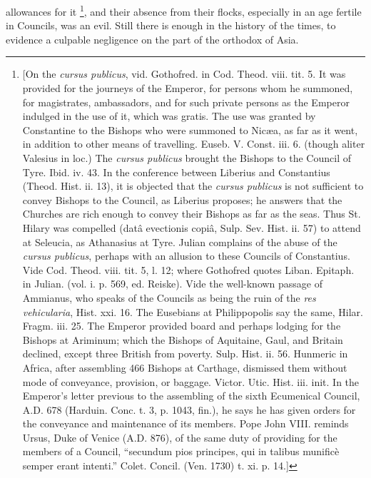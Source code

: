 allowances for it \footnote{[On the \emph{cursus publicus}, vid.
Gothofred. in Cod. Theod. viii. tit. 5. It was provided for the
journeys of the Emperor, for persons whom he summoned, for
magistrates, ambassadors, and for such private persons as the Emperor
indulged in the use of it, which was gratis. The use was granted by
Constantine to the Bishops who were summoned to Nicæa, as far as it
went, in addition to other means of travelling. Euseb. V. Const. iii.
6. (though aliter Valesius in loc.) The \emph{cursus publicus} brought
the Bishops to the Council of Tyre. Ibid. iv. 43. In the conference
between Liberius and Constantius (Theod. Hist. ii. 13), it is objected
that the \emph{cursus publicus} is not sufficient to convey Bishops to
the Council, as Liberius proposes; he answers that the Churches are
rich enough to convey their Bishops as far as the seas. Thus St.
Hilary was compelled (datâ evectionis copiâ, Sulp. Sev. Hist. ii.
57) to attend at Seleucia, as Athanasius at Tyre. Julian complains of
the abuse of the \emph{cursus publicus}, perhaps with an allusion to
these Councils of Constantius. Vide Cod. Theod. viii. tit. 5, l. 12;
where Gothofred quotes Liban. Epitaph. in Julian. (vol. i. p. 569, ed.
Reiske). Vide the well-known passage of Ammianus, who speaks of the
Councils as being the ruin of the \emph{res vehicularia}, Hist. xxi.
16. The Eusebians at Philippopolis say the same, Hilar. Fragm. iii.
25. The Emperor provided board and perhaps lodging for the Bishops at
Ariminum; which the Bishops of Aquitaine, Gaul, and Britain declined,
except three British from poverty. Sulp. Hist. ii. 56. Hunmeric in
Africa, after assembling 466 Bishops at Carthage, dismissed them
without mode of conveyance, provision, or baggage. Victor. Utic. Hist.
iii. init. In the Emperor's letter previous to the assembling of the
sixth Ecumenical Council, A.D. 678 (Harduin.
Conc. t. 3, p. 1043, fin.), he says he has given orders for the
conveyance and maintenance of its members. Pope John VIII. reminds
Ursus, Duke of Venice (A.D. 876), of the same
duty of providing for the members of a Council, ``secundum pios
principes, qui in talibus munificè semper erant intenti.'' Colet.
Concil. (Ven. 1730) t. xi. p. 14.]}, and
their absence from their flocks, especially in an age fertile in
Councils, was an evil. Still there is enough in the history of the
times, to evidence a culpable negligence on the part of the orthodox
of Asia.

